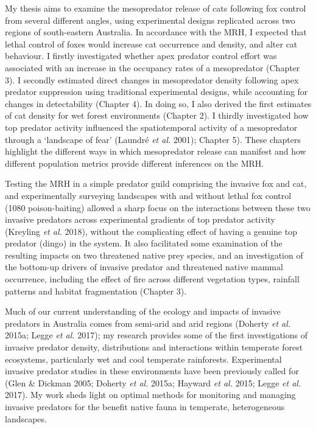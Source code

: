 \documentclass[11pt,a4paper,titlepage,twoside,openright]{style/unimelbthesis}
\begin{document}
\begin{mainmatter}
My thesis aims to examine the mesopredator release of cats following fox control from several different angles, using experimental designs replicated across two regions of south-eastern Australia. In accordance with the MRH, I expected that lethal control of foxes would increase cat occurrence and density, and alter cat behaviour. I firstly investigated whether apex predator control effort was associated with an increase in the occupancy rates of a mesopredator (Chapter 3). I secondly estimated direct changes in mesopredator density following apex predator suppression using traditional experimental designs, while accounting for changes in detectability (Chapter 4). In doing so, I also derived the first estimates of cat density for wet forest environments (Chapter 2). I thirdly investigated how top predator activity influenced the spatiotemporal activity of a mesopredator through a `landscape of fear' (Laundré \emph{et al.} 2001); Chapter 5). These chapters highlight the different ways in which mesopredator release can manifest and how different population metrics provide different inferences on the MRH.

Testing the MRH in a simple predator guild comprising the invasive fox and cat, and experimentally surveying landscapes with and without lethal fox control (1080 poison-baiting) allowed a sharp focus on the interactions between these two invasive predators across experimental gradients of top predator activity (Kreyling \emph{et al.} 2018), without the complicating effect of having a genuine top predator (dingo) in the system. It also facilitated some examination of the resulting impacts on two threatened native prey species, and an investigation of the bottom-up drivers of invasive predator and threatened native mammal occurrence, including the effect of fire across different vegetation types, rainfall patterns and habitat fragmentation (Chapter 3).

Much of our current understanding of the ecology and impacts of invasive predators in Australia comes from semi-arid and arid regions (Doherty \emph{et al.} 2015a; Legge \emph{et al.} 2017); my research provides some of the first investigations of invasive predator density, distributions and interactions within temperate forest ecosystems, particularly wet and cool temperate rainforests. Experimental invasive predator studies in these environments have been previously called for (Glen \& Dickman 2005; Doherty \emph{et al.} 2015a; Hayward \emph{et al.} 2015; Legge \emph{et al.} 2017). My work sheds light on optimal methods for monitoring and managing invasive predators for the benefit native fauna in temperate, heterogeneous landscapes.


\end{mainmatter}
\end{document}
